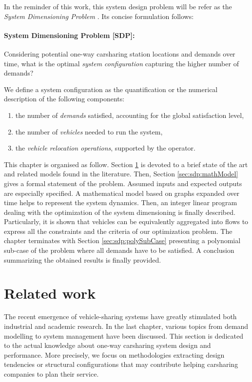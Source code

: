 \medskip
In the reminder of this work, this system design problem will be refer as the \emph{System Dimensioning Problem} {\SDP}.
Its concise formulation follows:
\paragraph{System Dimensioning Problem [SDP]:}
Considering potential one-way carsharing station locations and demands over time, what is the optimal \emph{system configuration} capturing the higher number of demands?

\bigskip
We define a system configuration as the quantification or the numerical description of the following components:
\begin{enumerate}
\item the number of \emph{demands} satisfied, accounting for the global satisfaction level,
\item the number of \emph{vehicles} needed to run the system,
\item the \emph{vehicle relocation operations}, supported by the operator.
\end{enumerate}

\medskip
This chapter is organised as follow.
Section \ref{sec:sdp:sota} is devoted to a brief state of the art and related models found in the literature.
Then, Section \ref{sec:sdp:mathModel} gives a formal statement of the problem.
Assumed inputs and expected outputs are especially specified.
A mathematical model based on graphs expanded over time helps to represent the system dynamics.
Then, an integer linear program dealing with the optimization of the system dimensioning is finally described.
Particularly, it is shown that vehicles can be equivalently aggregated into flows to express all the constraints and the criteria of our optimization problem.
The chapter terminates with Section \ref{sec:sdp:polySubCase} presenting a polynomial sub-case of the problem where all demands have to be satisfied.
A conclusion summarizing the obtained results is finally provided.


\section{Related work} \label{sec:sdp:sota}

The recent emergence of vehicle-sharing systems have greatly stimulated both industrial and academic research.
In the last chapter, various topics from demand modelling to system management have been discussed.
This section is dedicated to the actual knowledge about one-way carsharing system design and performance.
More precisely, we focus on methodologies extracting design tendencies or structural configurations that may contribute helping carsharing companies to plan their service.

